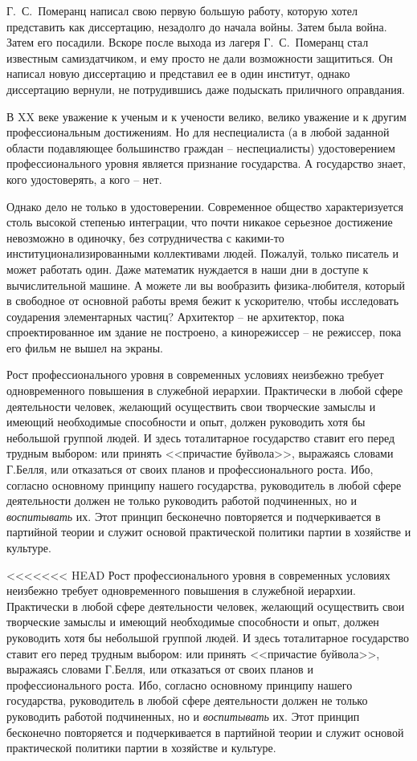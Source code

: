 \documentclass{book}
\begin{document}
Г.~С.~Померанц написал свою первую большую работу, которую хотел представить как диссертацию, незадолго до начала войны. Затем была война. Затем его посадили. Вскоре после выхода из лагеря Г.~С.~Померанц стал известным самиздатчиком, и ему просто не дали возможности защититься. Он написал новую диссертацию и представил ее в один институт, однако диссертацию вернули, не потрудившись даже подыскать приличного оправдания.

В XX веке уважение к ученым и к учености велико, велико уважение и к другим профессиональным достижениям. Но для неспециалиста (а в любой заданной области подавляющее большинство граждан -- неспециалисты) удостоверением профессионального уровня является признание государства. А государство знает, кого удостоверять, а кого -- нет.

Однако дело не только в удостоверении. Современное общество характеризуется столь высокой степенью интеграции, что почти никакое серьезное достижение невозможно в одиночку, без сотрудничества с какими-то институционализированными коллективами людей. Пожалуй, только писатель и может работать один. Даже математик нуждается в наши дни в доступе к вычислительной машине. А можете ли вы вообразить физика-любителя, который в свободное от основной работы время бежит к ускорителю, чтобы исследовать соударения элементарных частиц? Архитектор -- не архитектор, пока спроектированное им здание не построено, а кинорежиссер -- не режиссер, пока его фильм не вышел на экраны.

Рост профессионального уровня в современных условиях неизбежно требует одновременного повышения в служебной иерархии. Практически в любой сфере деятельности человек, желающий осуществить свои творческие замыслы и имеющий необходимые способности и опыт, должен руководить хотя бы небольшой группой людей. И здесь тоталитарное государство ставит его перед трудным выбором: или принять <<причастие буйвола>>, выражаясь словами Г.Белля, или отказаться от своих планов и профессионального роста. Ибо, согласно основному принципу нашего государства, руководитель в любой сфере деятельности должен не только руководить работой подчиненных, но и \textit{воспитывать} их. Этот принцип бесконечно повторяется и подчеркивается в партийной теории и служит основой практической политики партии в хозяйстве и культуре.

<<<<<<< HEAD
Рост профессионального уровня в современных условиях неизбежно требует одновременного повышения в служебной иерархии. Практически в любой сфере деятельности человек, желающий осуществить свои творческие замыслы и имеющий необходимые способности и опыт, должен руководить хотя бы небольшой группой людей. И здесь тоталитарное государство ставит его перед трудным выбором: или принять <<причастие буйвола>>, выражаясь словами Г.Белля, или отказаться от своих планов и профессионального роста. Ибо, согласно основному принципу нашего государства, руководитель в любой сфере деятельности должен не только руководить работой подчиненных, но и \textit{воспитывать} их. Этот принцип бесконечно повторяется и подчеркивается в партийной теории и служит основой практической политики партии в хозяйстве и культуре.
\end{document}

